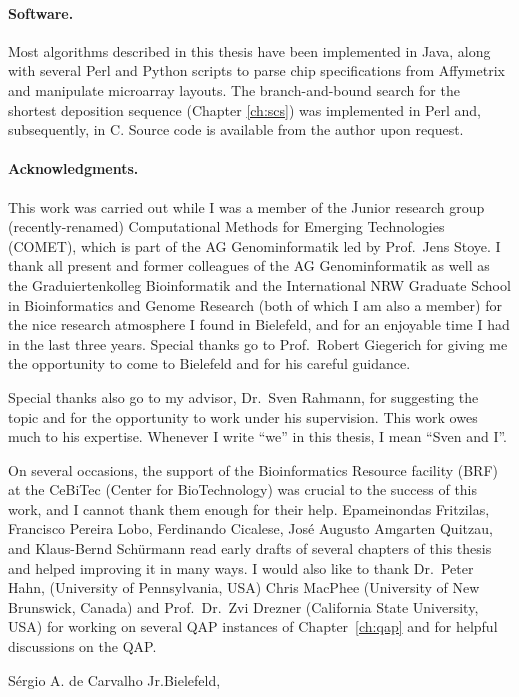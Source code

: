 \paragraph{Software.}
Most algorithms described in this thesis have been implemented in Java, along
with several Perl and Python scripts to parse chip specifications from
Affymetrix and manipulate microarray layouts. The branch-and-bound search for
the shortest deposition sequence (Chapter \ref{ch:scs}) was implemented in Perl
and, subsequently, in C. Source code is available from the author upon request.

\paragraph{Acknowledgments.}
This work was carried out while I was a member of the Junior research group
(recently-renamed) Computational Methods for Emerging Technologies (COMET), which
is part of the AG Genominformatik led by Prof.~Jens Stoye. I thank all present
and former colleagues of the AG Genominformatik as well as the Graduiertenkolleg
Bioinformatik and the International NRW Graduate School in Bioinformatics and
Genome Research (both of which I am also a member) for the nice research
atmosphere I found in Bielefeld, and for an enjoyable time I had in the last
three years. Special thanks go to Prof.~Robert Giegerich for giving me the
opportunity to come to Bielefeld and for his careful guidance.

Special thanks also go to my advisor, Dr.~Sven Rahmann, for suggesting the
topic and for the opportunity to work under his supervision. This work owes much
to his expertise. Whenever I write ``we'' in this thesis, I mean ``Sven and I''.

On several occasions, the support of the Bioinformatics Resource facility (BRF)
at the CeBiTec (Center for BioTechnology) was crucial to the success of this
work, and I cannot thank them enough for their help. Epameinondas Fritzilas,
Francisco Pereira Lobo, Ferdinando Cicalese, Jos\'e Augusto Amgarten Quitzau,
and Klaus-Bernd Sch\"urmann read early drafts of several chapters of this thesis
and helped improving it in many ways. I would also like to thank Dr.~Peter
Hahn, (University of Pennsylvania, USA) Chris MacPhee (University of New
Brunswick, Canada) and Prof.~Dr.~Zvi Drezner (California State University, USA)
for working on several QAP instances of Chapter~\ref{ch:qap} and for helpful
discussions on the QAP.

\vspace*{6ex}
S\'ergio A. de Carvalho Jr.\hfill Bielefeld, \handinmonth
